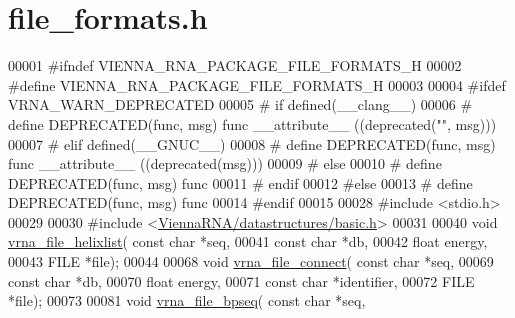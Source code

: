 \hypertarget{io_2file__formats_8h_source}{}\section{file\+\_\+formats.\+h}
\label{io_2file__formats_8h_source}

\begin{DoxyCode}
00001 \textcolor{preprocessor}{#ifndef VIENNA\_RNA\_PACKAGE\_FILE\_FORMATS\_H}
00002 \textcolor{preprocessor}{#define VIENNA\_RNA\_PACKAGE\_FILE\_FORMATS\_H}
00003 
00004 \textcolor{preprocessor}{#ifdef VRNA\_WARN\_DEPRECATED}
00005 \textcolor{preprocessor}{# if defined(\_\_clang\_\_)}
00006 \textcolor{preprocessor}{#  define DEPRECATED(func, msg) func \_\_attribute\_\_ ((deprecated("", msg)))}
00007 \textcolor{preprocessor}{# elif defined(\_\_GNUC\_\_)}
00008 \textcolor{preprocessor}{#  define DEPRECATED(func, msg) func \_\_attribute\_\_ ((deprecated(msg)))}
00009 \textcolor{preprocessor}{# else}
00010 \textcolor{preprocessor}{#  define DEPRECATED(func, msg) func}
00011 \textcolor{preprocessor}{# endif}
00012 \textcolor{preprocessor}{#else}
00013 \textcolor{preprocessor}{# define DEPRECATED(func, msg) func}
00014 \textcolor{preprocessor}{#endif}
00015 
00028 \textcolor{preprocessor}{#include <stdio.h>}
00029 
00030 \textcolor{preprocessor}{#include <\hyperlink{datastructures_2basic_8h}{ViennaRNA/datastructures/basic.h}>}
00031 
00040 \textcolor{keywordtype}{void} \hyperlink{group__file__formats_gaaface7db12fadc3d271641c4515ab6e4}{vrna\_file\_helixlist}( \textcolor{keyword}{const} \textcolor{keywordtype}{char} *seq,
00041                           \textcolor{keyword}{const} \textcolor{keywordtype}{char} *db,
00042                           \textcolor{keywordtype}{float} energy,
00043                           FILE *file);
00044 
00068 \textcolor{keywordtype}{void} \hyperlink{group__file__formats_gab69682373ccca1e0e28cc967eec07745}{vrna\_file\_connect}( \textcolor{keyword}{const} \textcolor{keywordtype}{char} *seq,
00069                         \textcolor{keyword}{const} \textcolor{keywordtype}{char} *db,
00070                         \textcolor{keywordtype}{float} energy,
00071                         \textcolor{keyword}{const} \textcolor{keywordtype}{char} *identifier,
00072                         FILE *file);
00073 
00081 \textcolor{keywordtype}{void} \hyperlink{group__file__formats_ga9b462e6f202594af5d3fa56e280d633f}{vrna\_file\_bpseq}( \textcolor{keyword}{const} \textcolor{keywordtype}{char} *seq,

\end{DoxyCode}
